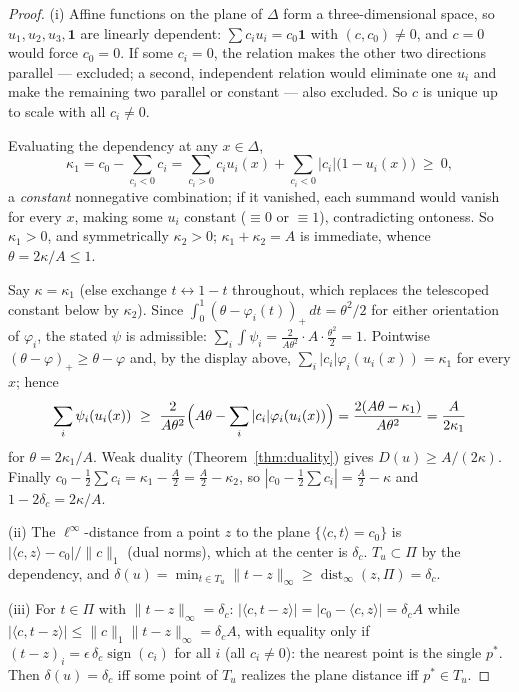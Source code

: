 \documentclass[11pt,reqno]{amsart}
\theoremstyle{plain}
\theoremstyle{definition}
\theoremstyle{remark}
\begin{document}
\begin{proof}
(i) Affine functions on the plane of $\Delta$ form a three-dimensional space,
so $u_1,u_2,u_3,\mathbf1$ are linearly dependent:
$\sum c_iu_i=c_0\mathbf1$ with $(c,c_0)\ne0$, and $c=0$ would force $c_0=0$.
If some $c_i=0$, the relation makes the other two directions parallel ---
excluded; a second, independent relation would eliminate one $u_i$ and make
the remaining two parallel or constant --- also excluded. So $c$ is unique up
to scale with all $c_i\ne0$.

Evaluating the dependency at any $x\in\Delta$,
\[
\kappa_1=c_0-\sum_{c_i<0}c_i
=\sum_{c_i>0}c_iu_i(x)+\sum_{c_i<0}|c_i|\bigl(1-u_i(x)\bigr)\ \ge\ 0,
\]
a \emph{constant} nonnegative combination; if it vanished, each summand would
vanish for every $x$, making some $u_i$ constant ($\equiv0$ or $\equiv1$),
contradicting ontoness. So $\kappa_1>0$, and symmetrically $\kappa_2>0$;
$\kappa_1+\kappa_2=A$ is immediate, whence $\theta=2\kappa/A\le1$.

Say $\kappa=\kappa_1$ (else exchange $t\leftrightarrow1-t$ throughout, which
replaces the telescoped constant below by $\kappa_2$). Since
$\int_0^1(\theta-\varphi_i(t))_+\,dt=\theta^2/2$ for either orientation of
$\varphi_i$, the stated $\psi$ is admissible:
$\sum_i\int\psi_i=\frac{2}{A\theta^2}\cdot A\cdot\frac{\theta^2}2=1$. Pointwise
$(\theta-\varphi)_+\ge\theta-\varphi$ and, by the display above,
$\sum_i|c_i|\varphi_i(u_i(x))=\kappa_1$ for every $x$; hence
\[
\sum_i\psi_i(u_i(x))\ \ge\ \frac{2}{A\theta^2}\Bigl(A\theta-
\sum_i|c_i|\varphi_i(u_i(x))\Bigr)=\frac{2(A\theta-\kappa_1)}{A\theta^2}
=\frac{A}{2\kappa_1}
\]
for $\theta=2\kappa_1/A$. Weak duality (Theorem~\ref{thm:duality}) gives
$D(u)\ge A/(2\kappa)$. Finally $c_0-\tfrac12\sum c_i=\kappa_1-\tfrac A2
=\tfrac A2-\kappa_2$, so $|c_0-\tfrac12\sum c_i|=\tfrac A2-\kappa$ and
$1-2\delta_c=2\kappa/A$.

(ii) The $\ell^\infty$-distance from a point $z$ to the plane
$\{\langle c,t\rangle=c_0\}$ is $|\langle c,z\rangle-c_0|/\|c\|_1$ (dual
norms), which at the center is $\delta_c$. $T_u\subset\Pi$ by the dependency,
and $\delta(u)=\min_{t\in T_u}\|t-z\|_\infty\ge\operatorname{dist}_\infty
(z,\Pi)=\delta_c$.

(iii) For $t\in\Pi$ with $\|t-z\|_\infty=\delta_c$:
$|\langle c,t-z\rangle|=|c_0-\langle c,z\rangle|=\delta_cA$ while
$|\langle c,t-z\rangle|\le\|c\|_1\|t-z\|_\infty=\delta_cA$, with equality only
if $(t-z)_i=\epsilon\,\delta_c\operatorname{sign}(c_i)$ for all $i$ (all
$c_i\ne0$): the nearest point is the single $p^\ast$. Then
$\delta(u)=\delta_c$ iff some point of $T_u$ realizes the plane distance iff
$p^\ast\in T_u$.
\end{proof}
\end{document}
